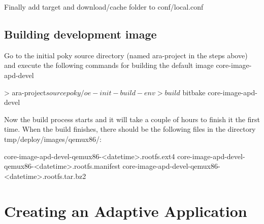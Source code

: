 \begin{DoxyItemize}
\item Finally add target and download/cache folder to conf/local.\+conf 

\end{DoxyItemize}

\subsection*{Building development image}


\begin{DoxyItemize}
\item Go to the initial poky source directory (named ara-\/project in the steps above) and execute the following commands for building the default image core-\/image-\/apd-\/devel 
\begin{DoxyCode}
>       ara-project$ source poky/oe-init-build-env
>       build$ bitbake core-image-apd-devel
\end{DoxyCode}

\item Now the build process starts and it will take a couple of hours to finish it the first time. When the build finishes, there should be the following files in the directory tmp/deploy/images/qemux86/\+: 
\begin{DoxyCode}
core-image-apd-devel-qemux86-<datetime>.rootfs.ext4
core-image-apd-devel-qemux86-<datetime>.rootfs.manifest
core-image-apd-devel-qemux86-<datetime>.rootfs.tar.bz2
\end{DoxyCode}

\end{DoxyItemize}

\section*{Creating an Adaptive Application}



